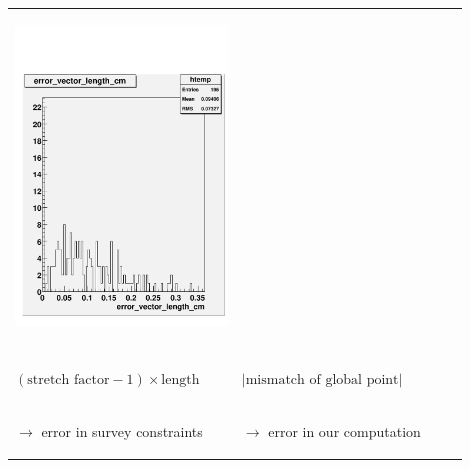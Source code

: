 \documentclass[compress]{beamer}
\begin{document}
\begin{frame}
\begin{center}
\begin{tabular}{p{0.45\linewidth} p{0.45\linewidth}}
\begin{minipage}{\linewidth}
\begin{center}
\includegraphics[width=0.9\linewidth]{error_length.pdf}
\end{center}
\end{minipage} \\
 & \\
\begin{minipage}{\linewidth}
\begin{center}
$(\mbox{stretch factor} - 1) \times \mbox{length}$
\end{center}
\end{minipage} &
\begin{minipage}{\linewidth}
\begin{center}
$\left|\mbox{mismatch of global point}\right|$
\end{center}
\end{minipage} \\
\begin{minipage}{\linewidth}
\begin{center}
$\to$ error in survey constraints
\end{center}
\end{minipage} &
\begin{minipage}{\linewidth}
\begin{center}
$\to$ error in our computation
\end{center}
\end{minipage} \\
\end{tabular}
\end{center}
\end{frame}

\begin{frame}
\label{numpages}
\end{frame}
\end{document}

